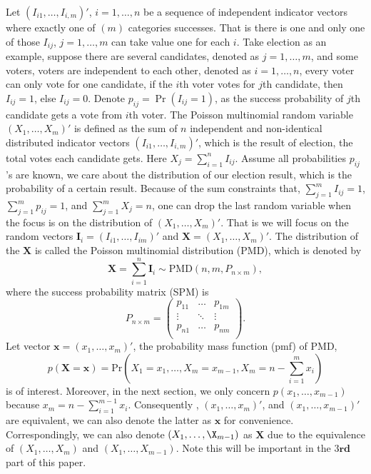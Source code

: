 \documentclass[12pt]{article}
\newcommand{\PMD}{\textrm{PMD}}
\begin{document}
Let $(I_{i1}, \ldots, I_{i,m})'$, $i = 1,\dots,n$ be a sequence of independent indicator vectors where exactly one of $(m)$ categories successes. That is there is one and only one of those $I_{ij}$, $j=1,\ldots, m$ can take value one for each $i$. Take election as an example, suppose there are several candidates, denoted as $j = 1,\dots,m$, and some voters, voters are independent to each other, denoted as $i = 1,\dots,n$, every voter can only vote for one candidate, if the $i$th voter votes for $j$th candidate, then $I_{ij} = 1$, else $I_{ij} = 0$.  Denote $p_{ij} = \Pr(I_{ij} = 1)$, as the success probability of $j$th candidate gets a vote from $i$th voter. The Poisson multinomial random variable $(X_1, \dots, X_m)' $ is defined as the sum of $n$ independent and non-identical distributed indicator vectors $(I_{i1}, \ldots, I_{i,m})'$, which is the result of election, the total votes each candidate gets. Here $X_j=\sum_{i=1}^{n}I_{ij}$. Assume all probabilities $p_{ij}$'s are known, we care about the distribution of our election result, which is the probability of a certain result. Because of the sum constraints that, $\sum_{j=1}^{m} I_{ij}= 1$, $\sum_{j=1}^{m} p_{ij}= 1$, and $\sum_{j=1}^{m} X_{j}= n$, one can drop the last random variable when the focus is on the distribution of $(X_1, \ldots, X_m)'$. That is we will focus on the random vectors $\boldsymbol{I}_i=(I_{i1}, \ldots, I_{im})'$ and $\boldsymbol{X}=(X_1, \ldots, X_m)'$. The distribution of the $\boldsymbol{X}$ is called the Poisson multinomial distribution (PMD), which is denoted by
$$\boldsymbol{X}  = \sum_{i = 1}^n \boldsymbol{I}_i \sim \PMD(n,m,P_{n\times m}),$$
where the success probability matrix (SPM) is
\begin{equation*}
P_{n \times m} = \begin{pmatrix}
p_{11} &  \dots & p_{1m} \\
\vdots & \ddots & \vdots \\
p_{n1} &  \dots & p_{nm} \\
\end{pmatrix}.
\end{equation*}
Let vector $\boldsymbol{x} = (x_1,\dots,x_m)'$, the probability mass function (pmf) of PMD,
$$p(\boldsymbol{X}=\boldsymbol{x}) = \text{Pr} \left( X_1 = x_1, \dots, X_m = x_{m-1}, X_{m} = n-\sum_{i=1}^{m}x_i \right)$$
is of interest. Moreover, in the next section, we only concern $p(x_1, \dots, x_{m-1})$ because $x_{m} = n-\sum_{i=1}^{m-1}x_i $. Consequently , $(x_{1},\dots,x_m)'$, and $(x_{1},\dots,x_{m-1})'$ are equivalent, we can also denote the latter as $\boldsymbol{x}$ for convenience. Correspondingly, we can also denote $(X_1,\dots,\X_{m-1})$ as $\boldsymbol{X}$ due to the equivalence of  $(X_1,\dots,X_m)$ and $(X_1,\dots,X_{m-1})$. Note this will be  important in the 3$\textbf{rd}$ part of this paper.\\
\end{document}
